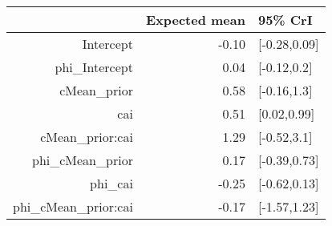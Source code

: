 \begin{tabular}{rrl}
  \hline
 & Expected mean & 95\% CrI \\ 
  \hline
Intercept & -0.10 & [-0.28,0.09] \\ 
  phi\_Intercept & 0.04 & [-0.12,0.2] \\ 
  cMean\_prior & 0.58 & [-0.16,1.3] \\ 
  cai & 0.51 & [0.02,0.99] \\ 
  cMean\_prior:cai & 1.29 & [-0.52,3.1] \\ 
  phi\_cMean\_prior & 0.17 & [-0.39,0.73] \\ 
  phi\_cai & -0.25 & [-0.62,0.13] \\ 
  phi\_cMean\_prior:cai & -0.17 & [-1.57,1.23] \\ 
   \hline
\end{tabular}


